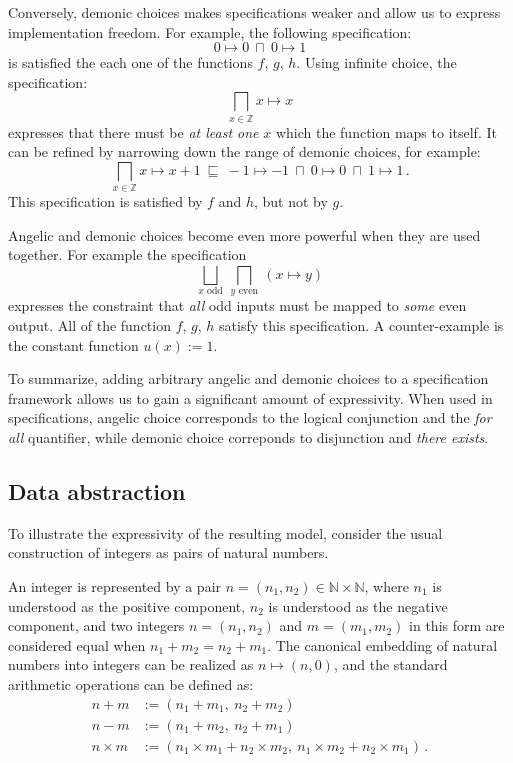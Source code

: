 \documentclass[11pt,oneside,draft]{book}
\theoremstyle{definition}
\newcommand{\refby}{\sqsubseteq} %
\begin{document}
Conversely,
demonic choices
makes specifications weaker and
allow us to express implementation freedom.
For example, the following specification:
\[
    0 \mapsto 0 \: \sqcap \: 0 \mapsto 1
\]
is satisfied the each one of the functions $f$, $g$, $h$.
Using infinite choice,
the specification:
\[
    \bigsqcap_{x \in \mathbb{Z}} x \mapsto x
\]
expresses that there must be \emph{at least one} $x$
which the function maps to itself.
It can be refined by narrowing down the range
of demonic choices, for example:
\[
  \bigsqcap_{x \in \mathbb{Z}} x \mapsto x + 1
  \: \refby \:
  -1 \mapsto -1
  \: \sqcap \:
  0 \mapsto 0
  \: \sqcap \:
  1 \mapsto 1
  \,.
\]
This specification is satisfied by $f$ and $h$,
but not by $g$.

Angelic and demonic choices become even more powerful
when they are used together.
For example the specification
\[
  \bigsqcup_{x \text{ odd}} \:
  \bigsqcap_{y \text{ even}} \:
  (x \mapsto y)
\]
expresses the constraint that \emph{all} odd inputs 
must be mapped to \emph{some} even output.
All of the function $f$, $g$, $h$ satisfy this specification.
A counter-example is the constant function $u(x) := 1$.

To summarize,
adding arbitrary angelic and demonic choices
to a specification framework
allows us to gain a significant amount of expressivity.
When used in specifications,
angelic choice corresponds to
the logical conjunction and the \emph{for all} quantifier,
while demonic choice correponds to
disjunction and \emph{there exists}.


\subsection{Data abstraction} \label{sec:fspec-ab} %

To illustrate the expressivity of the resulting model,
consider the usual construction of integers
as pairs of natural numbers.

An integer is represented by a pair
$n = (n_1, n_2) \in \mathbb{N} \times \mathbb{N}$,
where
$n_1$ is understood as the positive component,
$n_2$ is understood as the negative component,
and two integers $n = (n_1, n_2)$ and $m = (m_1, m_2)$
in this form
are considered equal when
$n_1 + m_2 = n_2 + m_1$.
The canonical embedding of natural numbers into integers
can be realized as $n \mapsto (n, 0)$, and
the standard arithmetic operations can be defined as:
\begin{align*}
  n + m &:= (n_1 + m_1, \: n_2 + m_2) \\
  n - m &:= (n_1 + m_2, \: n_2 + m_1) \\
  n \times m &:= (n_1 \times m_1 + n_2 \times m_2, \:
    n_1 \times m_2 + n_2 \times m_1)
  \,.
\end{align*}
\end{document}
